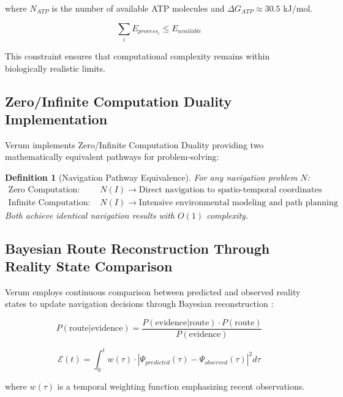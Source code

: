 \documentclass[12pt,a4paper]{article}
\newtheorem{definition}[theorem]{Definition}
\begin{document}
where $N_{ATP}$ is the number of available ATP molecules and $\Delta G_{ATP} \approx 30.5$ kJ/mol.

\begin{equation}
\sum_{i} E_{process_i} \leq E_{available}
\end{equation}

This constraint ensures that computational complexity remains within biologically realistic limits.

\subsection{Zero/Infinite Computation Duality Implementation}

Verum implements Zero/Infinite Computation Duality providing two mathematically equivalent pathways for problem-solving:

\begin{definition}[Navigation Pathway Equivalence]
For any navigation problem $N$:
\begin{align}
\text{Zero Computation:} \quad &N(I) \to \text{Direct navigation to spatio-temporal coordinates} \\
\text{Infinite Computation:} \quad &N(I) \to \text{Intensive environmental modeling and path planning}
\end{align}
Both achieve identical navigation results with $O(1)$ complexity.
\end{definition}

\subsection{Bayesian Route Reconstruction Through Reality State Comparison}

Verum employs continuous comparison between predicted and observed reality states to update navigation decisions through Bayesian reconstruction \cite{bishop2006,murphy2012}:

\begin{equation}
P(\text{route}|\text{evidence}) = \frac{P(\text{evidence}|\text{route}) \cdot P(\text{route})}{P(\text{evidence})}
\end{equation}

\begin{equation}
\mathcal{E}(t) = \int_0^t w(\tau) \cdot |\Psi_{predicted}(\tau) - \Psi_{observed}(\tau)|^2 d\tau
\end{equation}

where $w(\tau)$ is a temporal weighting function emphasizing recent observations.
\end{document}
